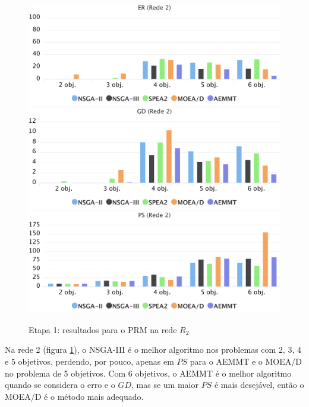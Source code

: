 \begin{figure}[!htbp]
	\caption{Etapa 1: resultados para o PRM na rede $R_2$}
	\label{fig_exp1_mrp_r2}
	\includegraphics[width=1\textwidth]{cap_experimentos/figs/etapa1/er-mrp-r2}
	\includegraphics[width=1\textwidth]{cap_experimentos/figs/etapa1/gd-mrp-r2}
	\includegraphics[width=1\textwidth]{cap_experimentos/figs/etapa1/ps-mrp-r2}
\end{figure}

Na rede 2 (figura \ref{fig_exp1_mrp_r2}), o NSGA-III é o melhor algoritmo nos problemas com 2, 3, 4 e 5 objetivos, perdendo, por pouco, apenas em $PS$ para o AEMMT e o MOEA/D no problema de 5 objetivos. Com 6 objetivos, o AEMMT é o melhor algoritmo quando se considera o erro e o $GD$, mas se um maior $PS$ é mais desejável, então o MOEA/D é o método mais adequado.

